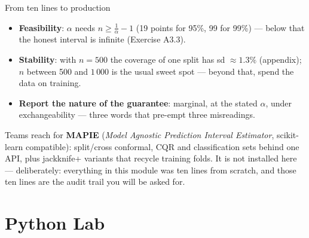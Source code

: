 \documentclass[aspectratio=169,11pt]{beamer}
\begin{document}
\begin{frame}{From ten lines to production}
  \footnotesize
  \begin{readme}
    \begin{itemize}
      \item \textbf{Feasibility}: $\alpha$ needs $n \ge \tfrac{1}{\alpha} - 1$
            (19 points for 95\%, 99 for 99\%) --- below that the honest interval is
            infinite (Exercise A3.3).
      \item \textbf{Stability}: with $n = 500$ the coverage of one split has sd
            $\approx 1.3\%$ (appendix); $n$ between 500 and $1\,000$ is the usual
            sweet spot --- beyond that, spend the data on training.
      \item \textbf{Report the nature of the guarantee}: marginal, at the stated
            $\alpha$, under exchangeability --- three words that pre-empt three
            misreadings.
    \end{itemize}
  \end{readme}
  \begin{takeaway}
    Teams reach for \textbf{MAPIE} (\emph{Model Agnostic Prediction Interval
    Estimator}, scikit-learn compatible): split/cross conformal, CQR and classification
    sets behind one API, plus jackknife+ variants that recycle training folds. It is not
    installed here --- deliberately: everything in this module was ten lines from
    scratch, and those ten lines are the audit trail you will be asked for.
  \end{takeaway}
\end{frame}

\section{Python Lab}
\end{document}
